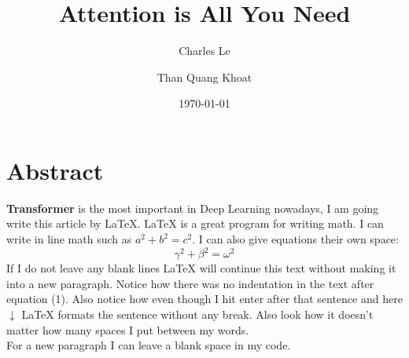 \documentclass[15pt,a4paper]{article}
\title{Attention is All You Need}
\author{Charles Le \and Than Quang Khoat}
\date{\today}
\begin{document}
    \maketitle 
    \section{Abstract} 
    \textbf{Transformer} is the most important in Deep Learning nowadays, I am going write this article by \LaTeX.
    \LaTeX{} is a great program for writing math. I can write in line math such as $a^2+b^2=c^2$. I can also give equations their own space:
    \begin{equation}
        \gamma^2 + \beta^2 = \omega^2
    \end{equation}
    If I do not leave any blank lines \LaTeX{} will continue  this text without making it into a new paragraph.  Notice how there was no indentation in the text after equation (1).  
    Also notice how even though I hit enter after that sentence and here $\downarrow$
    \LaTeX{} formats the sentence without any break.  Also look how it doesn't matter how many spaces I put between my words. \\ %
    For a new paragraph I can leave a blank space in my code. 
\end{document}
